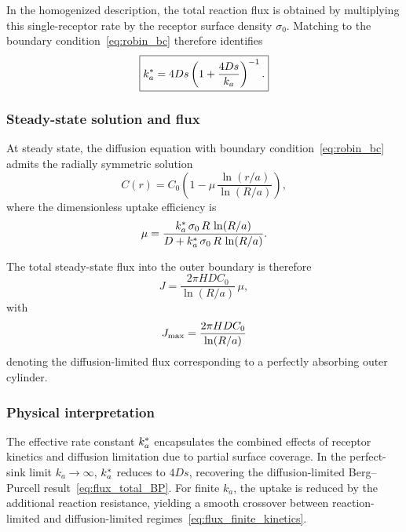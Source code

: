 In the homogenized description, the total reaction flux is obtained by multiplying this single-receptor rate by the receptor surface density $\sigma_{0}$.
Matching to the boundary condition~\eqref{eq:robin_bc} therefore identifies
\begin{equation}
    \boxed{k_a^{*} = 4Ds \left(1 + \frac{4Ds}{k_a}\right)^{-1}.}
    \label{eq:kastar}
\end{equation}

\subsubsection{Steady-state solution and flux}\label{sec:steady_state}
At steady state, the diffusion equation with boundary condition~\eqref{eq:robin_bc} admits the radially symmetric solution
\begin{equation}
    C(r) = C_{0}\left(1 - \mu \,\frac{\ln(r/a)}{\ln(R/a)}\right),
    \label{eq:C_profile}
\end{equation}
where the dimensionless uptake efficiency is
\begin{equation}
    \mu = \frac{k_a^{*} \, \sigma_{0} \, R \, \ln(R/a)}{D + k_a^{*} \, \sigma_{0} \, R \, \ln(R/a)}.
    \label{eq:mu}
\end{equation}

The total steady-state flux into the outer boundary is therefore
\begin{equation}
    J = \frac{2\pi H D C_{0}}{\ln(R/a)}\,\mu,
    \label{eq:J_mu}
\end{equation}
with
\begin{equation}
    J_{\mathrm{max}} = \frac{2\pi H D C_{0}}{\ln(R/a)}
    \label{eq:Jmax_def}
\end{equation}
denoting the diffusion-limited flux corresponding to a perfectly absorbing outer cylinder.

\subsubsection{Physical interpretation}\label{sec:interpretation}
The effective rate constant $k_a^{*}$ encapsulates the combined effects of receptor kinetics and diffusion limitation due to partial surface coverage.
In the perfect-sink limit $k_a \to \infty$, $k_a^{*}$ reduces to $4Ds$, recovering the diffusion-limited Berg--Purcell result~\eqref{eq:flux_total_BP}.
For finite $k_a$, the uptake is reduced by the additional reaction resistance, yielding a smooth crossover between reaction-limited and diffusion-limited regimes~\eqref{eq:flux_finite_kinetics}.

